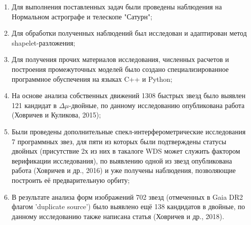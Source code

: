 \begin{enumerate}
 \item Для выполнения поставленных задач были проведены наблюдения на Нормальном астрографе и телескопе "Сатурн";
 \item Для обработки полученных наблюдений был исследован и адаптирован метод shapelet-разложения;
   \item Для получения прочих материалов исследования, численных расчетов и построения промежуточных моделей было создано специализированное программное обуспечения на языках C++ и Python;
 \item На основе анализа собственных движений 1308 быстрых звезд было выявлен 121 кандидат в $\Delta\mu$-двойные, по данному исследованию опубликована работа (Ховричев и Куликова, 2015);
 \item Были проведены дополнительные спекл-интерферометрические исследования 7 программных звез, для пяти из которых были подтверждены статусы двойных (присутствие 2х из них в такалоге WDS может служить фактором верификации исследования), по выявлению одной из звезд опубликована работа (Ховричев и др., 2016) и уже получены наблюдения, позволяющие построить её предварительную орбиту;
   \item В результате анализа форм изображений 702 звезд (отмеченных в Gaia DR2 флагом 'duplicate source') было выявлено ещё 138 кандидатов в двойные, по данному исследованию также написана статья (Ховричев и др., 2018).
\end{enumerate}

